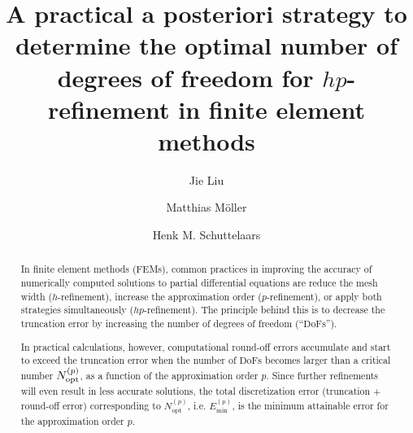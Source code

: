 \documentclass[final,3p]{elsarticle}
\begin{document}
\begin{frontmatter}

\title{A practical a posteriori strategy to determine the optimal number of degrees of freedom for $hp$-refinement in finite element methods}

 \author[1]{Jie Liu}						%
 \author[1]{Matthias M\"oller}
 \author[1]{Henk M. Schuttelaars}
 
 \address[1]{Delft Institute of Applied Mathematics\\ Delft University of Technology\\ Van Mourik Broekmanweg 6, 2628 XE Delft, The Netherlands}


\begin{abstract}

In finite element methods (FEMs), common practices in improving the accuracy of numerically computed solutions to partial differential equations are reduce the mesh width ($h$-refinement), increase the approximation order ($p$-refinement), or apply both strategies simultaneously ($hp$-refinement). The principle behind this is to decrease the truncation error by increasing the number of degrees of freedom (``$\text{DoFs}$'').

In practical calculations, however, computational round-off errors accumulate and start to exceed the truncation error when the number of $\text{DoFs}$ becomes larger than a critical number $N_{\rm opt}^{(p)}$, as a function of the approximation order $p$. Since further refinements will even result in less accurate solutions, the total discretization error (truncation + round-off error) corresponding to $N_{\text{opt}} ^{(p)}$, i.e. ${E}_{\text{min}}^{(p)}$, is the minimum attainable error for the approximation order $p$.


\end{abstract}
\end{frontmatter}
\end{document}
